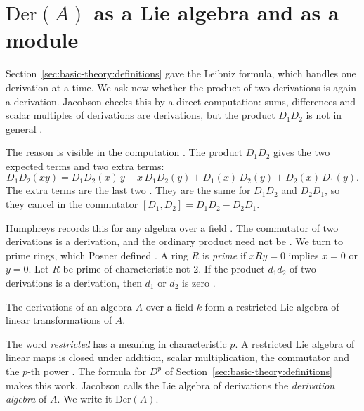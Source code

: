 \section[$\mathrm{Der}(A)$ as a Lie algebra and as a module][Derivations as a Lie algebra]{$\mathrm{Der}(A)$ as a Lie algebra and as a module}\label{sec:basic-theory:der-as-lie-algebra}

Section~\ref{sec:basic-theory:definitions} gave the Leibniz formula, which handles one derivation at a time. We ask now whether the product of two derivations is again a derivation. Jacobson
checks this by a direct computation: sums, differences and scalar multiples of
derivations are derivations, but the product $D_1D_2$ is not in general
\cite[p.~207]{Jacobson1937}.

The reason is visible in the computation \cite[p.~207]{Jacobson1937}. The product $D_1D_2$ gives the two
expected terms and two extra terms:
\[
D_1D_2(xy) = D_1D_2(x)\,y + x\,D_1D_2(y) + D_1(x)\,D_2(y) + D_2(x)\,D_1(y).
\]
The extra terms are the last two \cite[formula~(5), p.~207]{Jacobson1937}. They
are the same for $D_1D_2$ and $D_2D_1$, so they cancel in the commutator
$[D_1,D_2] = D_1D_2 - D_2D_1$.

Humphreys records this for any algebra over a field \cite[\S1.3, p.~4]{Humphreys1972}. The commutator of two
derivations is a derivation, and the ordinary product need not be
\cite[\S1.3, p.~4]{Humphreys1972}. We turn to prime rings, which Posner defined \cite[p.~1093]{Posner1957}. A ring $R$ is \emph{prime} if $xRy = 0$ implies $x = 0$ or $y = 0$. Let $R$ be prime of characteristic not $2$. If the
product $d_1d_2$ of two derivations is a derivation, then $d_1$ or $d_2$ is
zero \cite[Theorem~1, p.~1094]{Posner1957}.

\begin{theorem}\label{thm:basic:jacobson-lie}
The derivations of an algebra $A$ over a field $k$ form a restricted Lie
algebra of linear transformations of $A$.
\end{theorem}

The word \emph{restricted} has a meaning in characteristic $p$. A restricted
Lie algebra of linear maps is closed under addition, scalar multiplication, the
commutator and the $p$-th power \cite[p.~207]{Jacobson1937}. The formula for
$D^p$ of Section~\ref{sec:basic-theory:definitions} makes this work. Jacobson calls the Lie algebra of
derivations the \emph{derivation algebra} of $A$. We write it $\mathrm{Der}(A)$.

